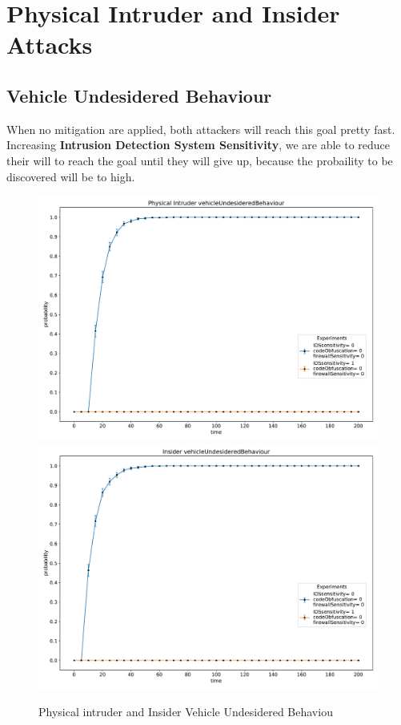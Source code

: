 \section{Physical Intruder and Insider Attacks}

\subsection*{Vehicle Undesidered Behaviour}
When no mitigation are applied, both attackers will reach this goal pretty fast. Increasing 
\textbf{Intrusion Detection System Sensitivity}, we are able to reduce their will to reach the goal
until they will give up, because the probaility to be discovered will be to high.
\begin{figure}[H]
    \begin{center}
        \includegraphics[scale=0.4]{img/Physical_vOB.pdf}
        \includegraphics[scale=0.4]{img/Insider_vOB.pdf}
    \end{center}
    \caption{Physical intruder and Insider Vehicle Undesidered Behaviou}
    \label{fig:P_I_vob}
    \vspace*{-3cm}
\end{figure}

